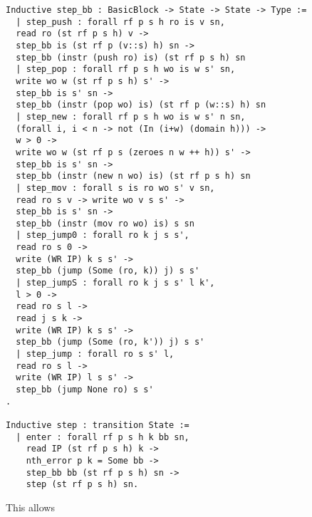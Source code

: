 \begin{verbatim}
Inductive step_bb : BasicBlock -> State -> State -> Type := 
  | step_push : forall rf p s h ro is v sn,
  read ro (st rf p s h) v -> 
  step_bb is (st rf p (v::s) h) sn -> 
  step_bb (instr (push ro) is) (st rf p s h) sn
  | step_pop : forall rf p s h wo is w s' sn,
  write wo w (st rf p s h) s' -> 
  step_bb is s' sn ->
  step_bb (instr (pop wo) is) (st rf p (w::s) h) sn
  | step_new : forall rf p s h wo is w s' n sn,
  (forall i, i < n -> not (In (i+w) (domain h))) ->
  w > 0 ->
  write wo w (st rf p s (zeroes n w ++ h)) s' ->
  step_bb is s' sn -> 
  step_bb (instr (new n wo) is) (st rf p s h) sn 
  | step_mov : forall s is ro wo s' v sn, 
  read ro s v -> write wo v s s' -> 
  step_bb is s' sn -> 
  step_bb (instr (mov ro wo) is) s sn
  | step_jump0 : forall ro k j s s', 
  read ro s 0 ->
  write (WR IP) k s s' -> 
  step_bb (jump (Some (ro, k)) j) s s'
  | step_jumpS : forall ro k j s s' l k', 
  l > 0 ->
  read ro s l ->
  read j s k -> 
  write (WR IP) k s s' -> 
  step_bb (jump (Some (ro, k')) j) s s'
  | step_jump : forall ro s s' l, 
  read ro s l ->
  write (WR IP) l s s' -> 
  step_bb (jump None ro) s s'
.

Inductive step : transition State :=
  | enter : forall rf p s h k bb sn,
    read IP (st rf p s h) k -> 
    nth_error p k = Some bb -> 
    step_bb bb (st rf p s h) sn ->
    step (st rf p s h) sn.
\end{verbatim}

This allows 
